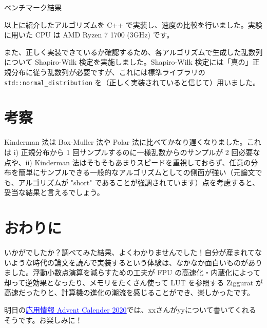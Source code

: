 \documentclass[twocolumn, dvipdfmx]{jsarticle}
\begin{document}
\begin{table*}
    \centering
    \caption{ベンチマーク結果}
    
    \label{tab:benchmark_result}
\end{table*}

以上に紹介したアルゴリズムを C++ で実装し、速度の比較を行いました。実験に用いた CPU は AMD Ryzen 7 1700 (3GHz) です。

また、正しく実装できているか確認するため、各アルゴリズムで生成した乱数列について Shapiro-Wilk 検定を実施しました。Shapiro-Wilk 検定には「真の」正規分布に従う乱数列が必要ですが、これには標準ライブラリの \texttt{std::normal\_distribution} を（正しく実装されていると信じて）用いました。

\section*{考察}

Kinderman 法は Box-Muller 法や Polar 法に比べてかなり遅くなりました。これは i) 正規分布から 1 回サンプルするのに一様乱数からのサンプルが 2 回必要な点や、ii) Kinderman 法はそもそもあまりスピードを重視しておらず、任意の分布を簡単にサンプルできる一般的なアルゴリズムとしての側面が強い（元論文でも、アルゴリズムが "short" であることが強調されています）点を考慮すると、妥当な結果と言えるでしょう。

\section*{おわりに}

いかがでしたか？調べてみた結果、よくわかりませんでした！自分が産まれてないような時代の論文を読んで実装するという体験は、なかなか面白いものがありました。浮動小数点演算を減らすための工夫が FPU の高速化・内蔵化によって却って逆効果となったり、メモリをたくさん使って LUT を参照する Ziggurat が高速だったりと、計算機の進化の潮流を感じることができ、楽しかったです。

明日の\href{https://adventar.org/calendars/5671}{\textcolor{blue}{\underline{応用情報 Advent Calender 2020}}}では、xxさんがyyについて書いてくれるそうです。お楽しみに！



\end{document}

